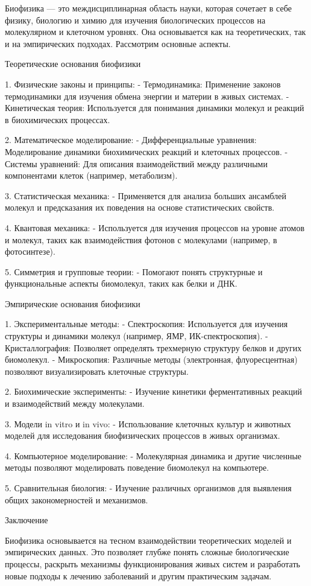 \documentclass[exam_answers.tex]{subfiles}
\begin{document}
\renewcommand{\baselinestretch}{\blch}

Биофизика — это междисциплинарная область науки, которая сочетает в себе физику, биологию и химию для изучения биологических процессов на молекулярном и клеточном уровнях.
Она основывается как на теоретических, так и на эмпирических подходах.
Рассмотрим основные аспекты.

Теоретические основания биофизики

1. Физические законы и принципы:
   - Термодинамика: Применение законов термодинамики для изучения обмена энергии и материи в живых системах.
   - Кинетическая теория: Используется для понимания динамики молекул и реакций в биохимических процессах.

2. Математическое моделирование:
   - Дифференциальные уравнения: Моделирование динамики биохимических реакций и клеточных процессов.
   - Системы уравнений: Для описания взаимодействий между различными компонентами клеток (например, метаболизм).

3. Статистическая механика:
   - Применяется для анализа больших ансамблей молекул и предсказания их поведения на основе статистических свойств.

4. Квантовая механика:
   - Используется для изучения процессов на уровне атомов и молекул, таких как взаимодействия фотонов с молекулами (например, в фотосинтезе).

5. Симметрия и групповые теории:
   - Помогают понять структурные и функциональные аспекты биомолекул, таких как белки и ДНК.

Эмпирические основания биофизики

1. Экспериментальные методы:
   - Спектроскопия: Используется для изучения структуры и динамики молекул (например, ЯМР, ИК-спектроскопия).
   - Кристаллография: Позволяет определять трехмерную структуру белков и других биомолекул.
   - Микроскопия: Различные методы (электронная, флуоресцентная) позволяют визуализировать клеточные структуры.

2. Биохимические эксперименты:
   - Изучение кинетики ферментативных реакций и взаимодействий между молекулами.

3. Модели in vitro и in vivo:
   - Использование клеточных культур и животных моделей для исследования биофизических процессов в живых организмах.

4. Компьютерное моделирование:
   - Молекулярная динамика и другие численные методы позволяют моделировать поведение биомолекул на компьютере.

5. Сравнительная биология:
   - Изучение различных организмов для выявления общих закономерностей и механизмов.

Заключение

Биофизика основывается на тесном взаимодействии теоретических моделей и эмпирических данных. Это позволяет глубже понять сложные биологические процессы, раскрыть механизмы функционирования живых систем и разработать новые подходы к лечению заболеваний и другим практическим задачам.
\end{document}
